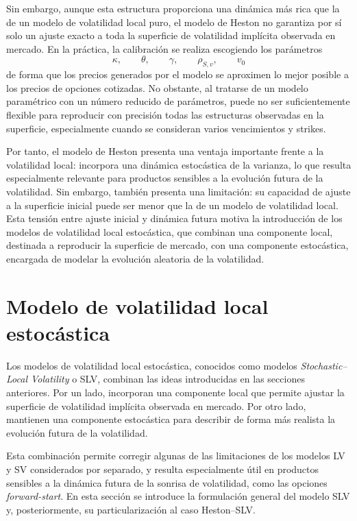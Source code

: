 Sin embargo, aunque esta estructura proporciona una dinámica más rica que la de un modelo de volatilidad local puro, el modelo de Heston no garantiza por sí solo un ajuste exacto a toda la superficie de volatilidad implícita observada en mercado. En la práctica, la calibración se realiza escogiendo los parámetros
\[
\kappa,\qquad \theta,\qquad \gamma,\qquad \rho_{S,v},\qquad v_0
\]
de forma que los precios generados por el modelo se aproximen lo mejor posible a los precios de opciones cotizadas. No obstante, al tratarse de un modelo paramétrico con un número reducido de parámetros, puede no ser suficientemente flexible para reproducir con precisión todas las estructuras observadas en la superficie, especialmente cuando se consideran varios vencimientos y strikes.

Por tanto, el modelo de Heston presenta una ventaja importante frente a la volatilidad local: incorpora una dinámica estocástica de la varianza, lo que resulta especialmente relevante para productos sensibles a la evolución futura de la volatilidad. Sin embargo, también presenta una limitación: su capacidad de ajuste a la superficie inicial puede ser menor que la de un modelo de volatilidad local. Esta tensión entre ajuste inicial y dinámica futura motiva la introducción de los modelos de volatilidad local estocástica, que combinan una componente local, destinada a reproducir la superficie de mercado, con una componente estocástica, encargada de modelar la evolución aleatoria de la volatilidad.


\section{Modelo de volatilidad local estocástica}

Los modelos de volatilidad local estocástica, conocidos como modelos \textit{Stochastic--Local Volatility} o SLV, combinan las ideas introducidas en las secciones anteriores. Por un lado, incorporan una componente local que permite ajustar la superficie de volatilidad implícita observada en mercado. Por otro lado, mantienen una componente estocástica para describir de forma más realista la evolución futura de la volatilidad.\medskip

Esta combinación permite corregir algunas de las limitaciones de los modelos LV y SV considerados por separado, y resulta especialmente útil en productos sensibles a la dinámica futura de la sonrisa de volatilidad, como las opciones \textit{forward-start}. En esta sección se introduce la formulación general del modelo SLV y, posteriormente, su particularización al caso Heston--SLV.

